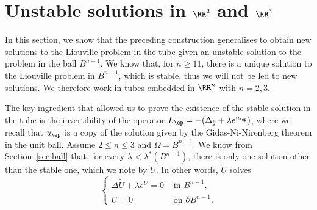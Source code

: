 \section{Unstable solutions in $\RR^2$ and $\RR^3$}

In this section, we show that the preceding construction generalises to obtain
new solutions to the Liouville problem in the tube given an unstable solution to
the problem in the ball $B^{n-1}$. We know that, for $n\geq 11$, there is a
unique solution to the Liouville problem in $B^{n-1}$, which is stable, thus we
will not be led to new solutions. We therefore work in tubes embedded in
$\RR^n$ with $n=2,3$.

The key ingredient that allowed us to prove the existence of the stable solution
in the tube is the invertibility of the operator $L_\ep=-(\Delta_{\mathring
g}+\lambda e^{u_\ep})$, where we recall that $u_\ep$ is a copy of the solution
given by the Gidas-Ni-Nirenberg theorem in the unit ball. Assume $2\leq n\leq 3$
and $\Omega=B^{n-1}$. We know from Section~\ref{sec:ball} that, for every
$\lambda < \lambda^\ast(B^{n-1})$, there is only one solution other than the
stable one, which we note by $\tilde U$. In other words, $\tilde U$ solves
\begin{equation}
\label{eq:u-tilde}
\left\{
\begin{array}{cc}
\Delta \tilde U + \lambda e^{\tilde U}=0 & \mbox{ in }B^{n-1},\\
\tilde U = 0 &\mbox{ on }\partial B^{n-1}.
\end{array}
\right.
\end{equation}

